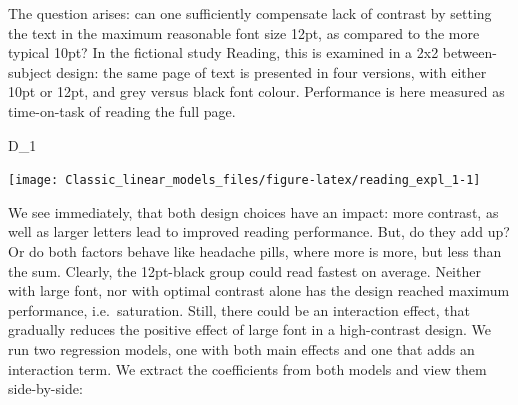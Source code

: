 \documentclass[]{svmono}
\newenvironment{Shaded}{\begin{snugshade}}{\end{snugshade}}
\newcommand{\KeywordTok}[1]{\textcolor[rgb]{0.13,0.29,0.53}{\textbf{#1}}}
\newcommand{\DataTypeTok}[1]{\textcolor[rgb]{0.13,0.29,0.53}{#1}}
\newcommand{\DecValTok}[1]{\textcolor[rgb]{0.00,0.00,0.81}{#1}}
\newcommand{\StringTok}[1]{\textcolor[rgb]{0.31,0.60,0.02}{#1}}
\newcommand{\OperatorTok}[1]{\textcolor[rgb]{0.81,0.36,0.00}{\textbf{#1}}}
\newcommand{\NormalTok}[1]{#1}
\begin{document}
The question arises: can one sufficiently compensate lack of contrast by
setting the text in the maximum reasonable font size 12pt, as compared
to the more typical 10pt? In the fictional study Reading, this is
examined in a 2x2 between-subject design: the same page of text is
presented in four versions, with either 10pt or 12pt, and grey versus
black font colour. Performance is here measured as time-on-task of
reading the full page.

\begin{Shaded}
\begin{Highlighting}[]
\NormalTok{D_}\DecValTok{1}
\end{Highlighting}
\end{Shaded}

\begin{Shaded}
\end{Shaded}

\texttt{[image: Classic\_linear\_models\_files/figure-latex/reading\_expl\_1-1]}

We see immediately, that both design choices have an impact: more
contrast, as well as larger letters lead to improved reading
performance. But, do they add up? Or do both factors behave like
headache pills, where more is more, but less than the sum. Clearly, the
12pt-black group could read fastest on average. Neither with large font,
nor with optimal contrast alone has the design reached maximum
performance, i.e.~saturation. Still, there could be an interaction
effect, that gradually reduces the positive effect of large font in a
high-contrast design. We run two regression models, one with both main
effects and one that adds an interaction term. We extract the
coefficients from both models and view them side-by-side:

\begin{Shaded}
\end{Shaded}
\end{document}
